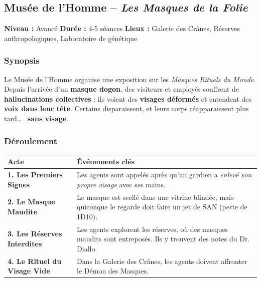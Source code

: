 \documentclass[10pt,a5paper,twoside]{book}
\begin{document}
\newpage

\subsection{Musée de l'Homme -- \textit{Les Masques de la Folie}}

\begin{shaded}
	\textbf{Niveau :} Avancé \quad
	\textbf{Durée :} 4-5 séances \quad
	\textbf{Lieux :} Galerie des Crânes, Réserves anthropologiques, Laboratoire de génétique
\end{shaded}

\subsubsection*{Synopsis}

Le Musée de l'Homme organise une exposition sur les \textit{Masques Rituels du Monde}. Depuis l'arrivée d'un \textbf{masque dogon}, des visiteurs et employés souffrent de \textbf{hallucinations collectives} : ils voient des \textbf{visages déformés} et entendent des \textbf{voix dans leur tête}. Certains disparaissent, et leurs corps réapparaissent plus tard\ldots~  \textbf{sans visage}.

\subsubsection*{Déroulement}
\begin{center}
	\begin{tabular}{|P{3cm}|P{9cm}|}
	\hline
	\textbf{Acte} 							& \textbf{Événements clés} \\ \hline
	\textbf{1. Les Premiers Signes} 		& Les agents sont appelés après qu'un gardien a \textit{enlevé son propre visage} avec ses mains. \\ \hline
	\textbf{2. Le Masque Maudite} 			& Le masque est scellé dans une vitrine blindée, mais quiconque le regarde doit faire un jet de SAN (perte de 1D10). \\ \hline
	\textbf{3. Les Réserves Interdites} 	& Les agents explorent les réserves, où des masques maudits sont entreposés. Ils y trouvent des notes du Dr. Diallo. \\ \hline
	\textbf{4. Le Rituel du Visage Vide} 	& Dans la Galerie des Crânes, les agents doivent affronter le Démon des Masques. \\ \hline
	\end{tabular}
\end{center}
\end{document}
